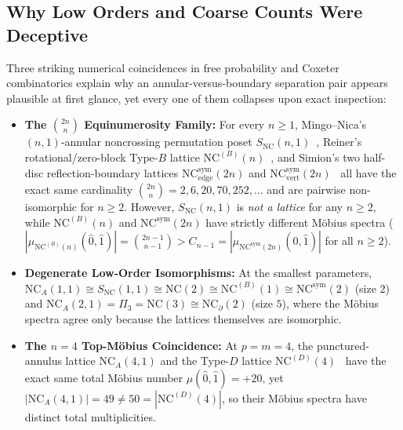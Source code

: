 \documentclass[11pt]{article}
\theoremstyle{definition}
\newcommand{\NC}{\mathrm{NC}}
\newcommand{\NCA}{\mathrm{NC}_A}
\newcommand{\SNC}{S_{\mathrm{NC}}}
\newcommand{\NCB}{\mathrm{NC}^{(B)}}
\newcommand{\NCD}{\mathrm{NC}^{(D)}}
\newcommand{\NCsym}{\mathrm{NC}^{\mathrm{sym}}}
\begin{document}
\subsection{Why Low Orders and Coarse Counts Were Deceptive}
Three striking numerical coincidences in free probability and Coxeter combinatorics explain why an annular-versus-boundary separation pair appears plausible at first glance, yet every one of them collapses upon exact inspection:
\begin{itemize}
  \item \textbf{The $\binom{2n}{n}$ Equinumerosity Family:} For every $n \ge 1$, Mingo--Nica's $(n,1)$-annular noncrossing permutation poset $\SNC(n,1)$~\cite{MN04}, Reiner's rotational/zero-block Type-$B$ lattice $\NCB(n)$~\cite{Rei97,BGN03}, and Simion's two half-disc reflection-boundary lattices $\NCsym_{\mathrm{edge}}(2n)$ and $\NCsym_{\mathrm{vert}}(2n)$~\cite{SU91,Sim00} all have the exact same cardinality $\binom{2n}{n} = 2, 6, 20, 70, 252, \dots$ and are pairwise non-isomorphic for $n \ge 2$. However, $\SNC(n,1)$ is \emph{not a lattice} for any $n \ge 2$, while $\NCB(n)$ and $\NCsym(2n)$ have strictly different M\"obius spectra ($|\mu_{\NCB(n)}(\hat{0},\hat{1})| = \binom{2n-1}{n-1} > C_{n-1} = |\mu_{\NCsym(2n)}(\hat{0},\hat{1})|$ for all $n \ge 2$).
  \item \textbf{Degenerate Low-Order Isomorphisms:} At the smallest parameters, $\NCA(1,1) \cong \SNC(1,1) \cong \NC(2) \cong \NCB(1) \cong \NCsym(2)$ (size $2$) and $\NCA(2,1) = \Pi_3 = \NC(3) \cong \NC_\partial(2)$ (size $5$), where the M\"obius spectra agree only because the lattices themselves are isomorphic.
  \item \textbf{The $n = 4$ Top-M\"obius Coincidence:} At $p = m = 4$, the punctured-annulus lattice $\NCA(4,1)$ and the Type-$D$ lattice $\NCD(4)$~\cite{AR04} have the exact same total M\"obius number $\mu(\hat{0},\hat{1}) = +20$, yet $|\NCA(4,1)| = 49 \ne 50 = |\NCD(4)|$, so their M\"obius spectra have distinct total multiplicities.
\end{itemize}
\end{document}
